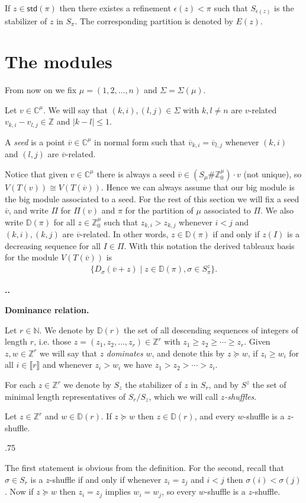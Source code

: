 \documentclass[11pt,fleqn]{amsart}
\makeatletter
\renewcommand\thesection{\arabic{section}}
\renewcommand\proofname{Proof}
\renewenvironment{proof}[1][\textit{\proofname}]{\par
 \pushQED{\qed}%
 \normalfont \topsep.75\paraskip\relax
 \trivlist
 \item[\hskip\labelsep
 \itshape
 #1\@addpunct{.}]\ignorespaces
}{%
 \popQED\endtrivlist\@endpefalse
}
\newcounter{para}[section]
\renewcommand\thepara{\thesection.\arabic{para}}
\def\paragraph{%
 \noindent
 \refstepcounter{para}%
 \textbf{\thepara.}\hspace{1ex}%
}
\newcommand\about[1]{%
 {\bfseries#1.}%
}
\newcommand\NN{\mathbb N}
\newcommand\CC{\mathbb C}
\newcommand\ZZ{\mathbb Z}
\newcommand\std{\mathsf{std}}
\newcommand\vv{\overline{v}}
\newcommand\interval[1]{\llbracket #1 \rrbracket}
\newcommand\Desc[1]{\mathbb D(#1)}
\makeatother
\begin{document}
If $z \in \std(\pi)$ then there existes a refinement $\epsilon(z) < \pi$ 
such that $S_{\epsilon(z)}$ is the stabilizer of $z$ in $S_\pi$. The 
corresponding partition is denoted by $E(z)$. 


\section{The modules}
From now on we fix $\mu = (1,2,\ldots, n)$ and $\Sigma = \Sigma(\mu)$.

Let $v \in \CC^\mu$. We will say that $(k,i), (l,j) \in \Sigma$ with $k,l \neq 
n$ are $v$-related $v_{k,i} - v_{l,j} \in \ZZ$ and $|k-l| \leq 1$. 
\begin{Definition}
A \emph{seed} is a point $\vv \in \CC^\mu$ in normal form such that 
$\vv_{k,i} = \vv_{l,j}$ whenever $(k,i)$ and $(l,j)$ are $\vv$-related.
\end{Definition}
Notice that given $v \in \CC^\mu$ there is always a seed $\vv \in (S_\mu \# 
\ZZ^\mu_0) \cdot v$ (not unique), so $V(T(v)) \cong V(T(\vv))$. Hence we can
always assume that our big module is the big module associated to a seed. 
For the rest of this section we will fix a seed $\vv$, and write $\Pi$ for 
$\Pi(v)$ and $\pi$ for the partition of $\mu$ associated to $\Pi$. We also 
write $\Desc{\pi}$ for all $z \in \ZZ^\mu_0$ such that $z_{k,i} > z_{k,j}$
whenever $i<j$ and $(k,i), (k,j)$ are $\vv$-related. In other words, $z \in
\Desc{\pi}$ if and only if $z(I)$ is a 
decreasing sequence for all $I \in \Pi$. With
this notation the derived tableaux basis for the module $V(T(\vv))$ is
\begin{align*}
\{D_\sigma(\vv + z) \mid z \in \Desc{\pi}, \sigma \in S_\pi^z\}.
\end{align*}

\paragraph
\about{Dominance relation}
\label{dominance-relation}
Let $r \in \NN$. We denote by $\Desc{r}$ the set of all descending sequences
of integers of length $r$, i.e. those $z = (z_1, z_2, \ldots, z_r) \in \ZZ^r$
with $z_1 \geq z_2 \geq \cdots \geq z_r$. Given $z, w \in \ZZ^r$ we will say
that $z$ \emph{dominates} $w$, and denote this by $z \succeq w$, if $z_i \geq 
w_i$ for all $i \in \interval{r}$ and whenever $z_i > w_i$ we have $z_1 > z_2
> \cdots > z_i$. 

For each $z \in \ZZ^r$ we denote by $S_z$ the stabilizer of $z$ in $S_r$, and
by $S^z$ the set of minimal length representatives of $S_r/S_z$, which we will
call \emph{$z$-shuffles}. 
\begin{Lemma*}
Let $z \in \ZZ^r$ and $w \in \Desc{r}$. If $z \succeq w$ then $z \in 
\Desc{r}$, and every $w$-shuffle is a $z$-shuffle.
\end{Lemma*}
\begin{proof}
The first statement is obvious from the definition. For the second, recall that
$\sigma \in S_r$ is a $z$-shuffle if and only if whenever $z_i = z_j$ and 
$i<j$ then $\sigma(i) < \sigma(j)$. Now if $z \succeq w$ then $z_i = z_j$
implies $w_i = w_j$, so every $w$-shuffle is a $z$-shuffle.
\end{proof}
\end{document}

